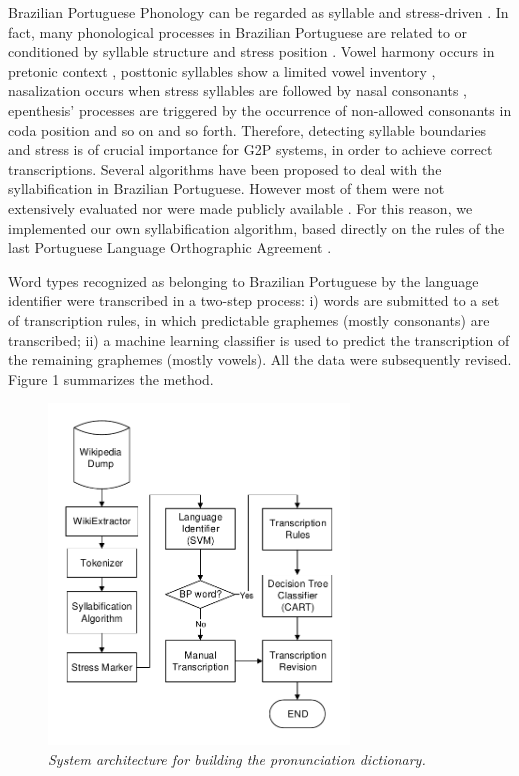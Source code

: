 Brazilian Portuguese Phonology can be regarded as syllable and stress-driven \cite{Cristofaro2005}. In fact,
many phonological processes in Brazilian Portuguese are related to or conditioned by 
syllable structure and stress position \cite{Girelli1990}. Vowel harmony occurs in pretonic context 
\cite{Bisol1989}, posttonic syllables show a limited vowel inventory \cite{Cristofaro2005}, nasalization occurs
when stress syllables are followed by nasal consonants \cite{Quicoli1990}, epenthesis' processes are triggered
by the occurrence of non-allowed consonants in coda position \cite{Delatorre2005} and so on and so forth. Therefore, 
detecting syllable boundaries and stress is of crucial importance for G2P systems, in order to achieve 
correct transcriptions. Several algorithms have been proposed to deal with the syllabification in Brazilian
Portuguese. However most of them were not extensively evaluated nor were made publicly available \cite{Oliveira2005}
\cite{Nhenhem2012} \cite{Neto2011} \cite{Rocha2013}. For this reason, we implemented our own syllabification algorithm, 
based directly on the rules of the last Portuguese Language Orthographic Agreement \cite{Acordo2009}. 

Word types recognized as belonging to Brazilian Portuguese by the language identifier were transcribed in a two-step process:
i) words are submitted to a set of transcription rules, in which predictable graphemes (mostly consonants)
are transcribed; ii) a machine learning classifier is used to predict the transcription of the remaining graphemes (mostly vowels). 
All the data were subsequently revised. Figure 1 summarizes the method.

\begin{figure}[t]
\centerline{ \includegraphics[width=8cm]{./gfx/aeiouado-flowchart-mod.pdf}}
\caption{{\it System architecture for building the pronunciation dictionary.}}
\label{g2p-architecture}
\end{figure}


